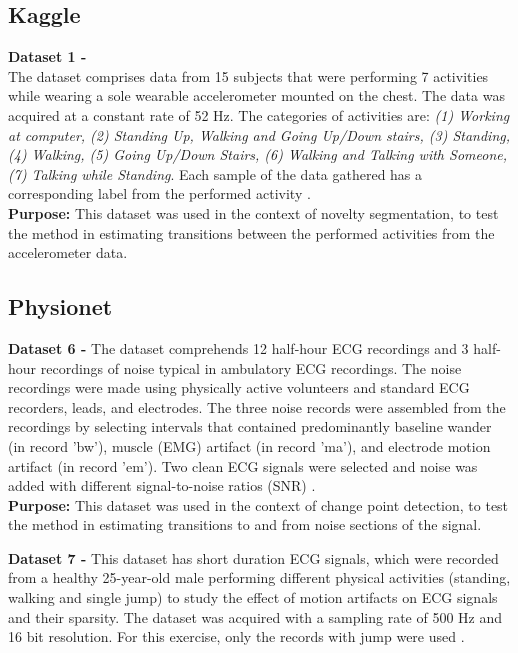 \subsection{Kaggle}

\item \textbf{Dataset 1 - }\\
The dataset comprises data from 15 subjects that were performing 7 activities while wearing a sole wearable accelerometer mounted on the chest. The data was acquired at a constant rate of 52 Hz. The categories of activities are: \textit{(1) Working at computer, (2) Standing Up, Walking and Going Up/Down stairs, (3) Standing, (4) Walking, (5) Going Up/Down Stairs, (6) Walking and Talking with Someone, (7) Talking while Standing}. Each sample of the data gathered has a corresponding label from the performed activity \cite{dataset1}.\\

\textbf{Purpose:} This dataset was used in the context of novelty segmentation, to test the method in estimating transitions between the performed activities from the accelerometer data.

\subsection{Physionet}

\item \textbf{Dataset 6 - } The dataset comprehends 12 half-hour ECG recordings and 3 half-hour recordings of noise typical in ambulatory ECG recordings. The noise recordings were made using physically active volunteers and standard ECG recorders, leads, and electrodes. The three noise records were assembled from the recordings by selecting intervals that contained predominantly baseline wander (in record 'bw'), muscle (EMG) artifact (in record 'ma'), and electrode motion artifact (in record 'em'). Two clean ECG signals were selected and noise was added with different signal-to-noise ratios (SNR) \cite{dataset6, PhysioNet}.\\

\textbf{Purpose:} This dataset was used in the context of change point detection, to test the method in estimating transitions to and from noise sections of the signal.
    
\item \textbf{Dataset 7 - } This dataset has short duration ECG signals, which were recorded from a healthy 25-year-old male performing different physical activities (standing, walking and single jump) to study the effect of motion artifacts on ECG signals and their sparsity. The dataset was acquired with a sampling rate of 500 Hz and 16 bit resolution. For this exercise, only the records with jump were used \cite{dataset7, PhysioNet}.\\

